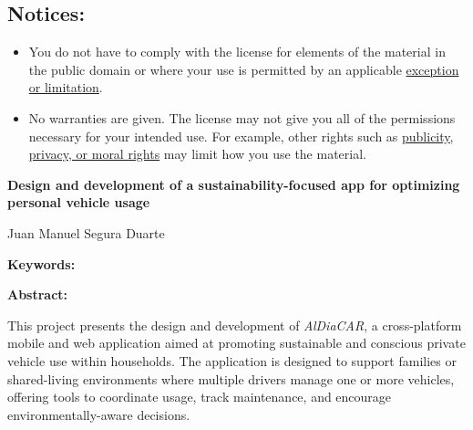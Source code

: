 \begin{tcolorbox}
\vspace{-4mm} %
\section*{\scriptsize\bfseries Notices:}
\vspace{-\baselineskip} %
\begin{itemize}[itemsep=1pt,leftmargin=18pt,partopsep=0pt]
    \item You do not have to comply with the license for elements of the material in the public domain or where your use is permitted by an applicable \href{https://creativecommons.org/licenses/by/3.0/#ref-exception-or-limitation}{exception or limitation}.
    \item No warranties are given. The license may not give you all of the permissions necessary for your intended use. For example, other rights such as \href{https://creativecommons.org/licenses/by/3.0/#ref-publicity-privacy-or-moral-rights}{publicity, privacy, or moral rights} may limit how you use the material.
\end{itemize}
\end{tcolorbox}
\restoregeometry

\clearpage
\mbox{}
\newpage


\clearpage
\mbox{}
\newpage


\begin{center}
    {\large\bfseries Design and development of a sustainability-focused app for optimizing personal vehicle usage}
\end{center}
\begin{center}
    Juan Manuel Segura Duarte
\end{center}

\begin{flushleft}
    \textbf{Keywords:}
\end{flushleft}

\begin{flushleft}
    \textbf{Abstract:}
\end{flushleft}


This project presents the design and development of \textit{AlDiaCAR}, a cross-platform mobile and web application aimed at promoting sustainable and conscious private vehicle use within households. The application is designed to support families or shared-living environments where multiple drivers manage one or more vehicles, offering tools to coordinate usage, track maintenance, and encourage environmentally-aware decisions.

